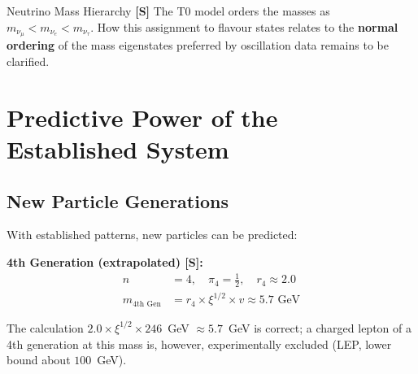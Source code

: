 	\begin{table}[H]
		\centering
		\caption{T0 neutrino predictions vs. experimental constraints}
		\label{tab:neutrino_validation}
	\end{table}
	
	\begin{important}{Neutrino Mass Hierarchy}{}
		\textbf{[S]} The T0 model orders the masses as $m_{\nu_\mu} < m_{\nu_e} < m_{\nu_\tau}$. How this assignment to flavour states relates to the \textbf{normal ordering} of the mass eigenstates preferred by oscillation data remains to be clarified.
	\end{important}
	
	\section{Predictive Power of the Established System}
	\label{sec:predictive_power}
	
	\subsection{New Particle Generations}
	\label{subsec:new_generations}
	
	With established patterns, new particles can be predicted:
	
	\textbf{4th Generation (extrapolated) [S]:}
	\begin{align}
		n &= 4, \quad \pi_4 = \frac{1}{2}, \quad r_4 \approx 2.0 \\
		m_{\text{4th Gen}} &= r_4 \times \xi^{1/2} \times v \approx 5.7 \text{ GeV}
	\end{align}
	
	The calculation $2.0 \times \xi^{1/2} \times 246$~GeV $\approx 5.7$~GeV is correct; a charged lepton of a 4th generation at this mass is, however, experimentally excluded (LEP, lower bound about $100$~GeV).
	
